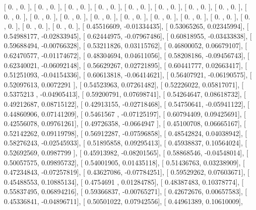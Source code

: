\documentclass{article}
\begin{document}
       [ 0.        ,  0.        ],
       [ 0.        ,  0.        ],
       [ 0.        ,  0.        ],
       [ 0.        ,  0.        ],
       [ 0.        ,  0.        ],
       [ 0.        ,  0.        ],
       [ 0.        ,  0.        ],
       [ 0.        ,  0.        ],
       [ 0.        ,  0.        ],
       [ 0.        ,  0.        ],
       [ 0.        ,  0.        ],
       [ 0.        ,  0.        ],
       [ 0.        ,  0.        ],
       [ 0.        ,  0.        ],
       [ 0.        ,  0.        ],
       [ 0.        ,  0.        ],
       [ 0.        ,  0.        ],
       [ 0.        ,  0.        ],
       [ 0.        ,  0.        ],
       [ 0.45516609, -0.01334435],
       [ 0.53065265,  0.02345994],
       [ 0.54988177, -0.02833945],
       [ 0.62444975, -0.07967486],
       [ 0.60818955, -0.03433838],
       [ 0.59688494, -0.00766328],
       [ 0.53211826,  0.03115762],
       [ 0.46800052,  0.06679107],
       [ 0.62470577, -0.01174672],
       [ 0.48304694,  0.04611056],
       [ 0.58208186, -0.09456743],
       [ 0.62340021, -0.06092148],
       [ 0.56629267,  0.02721895],
       [ 0.60441777,  0.02663417],
       [ 0.51251093, -0.04154336],
       [ 0.60613818, -0.06414621],
       [ 0.56407921, -0.06190575],
       [ 0.52097613,  0.0072291 ],
       [ 0.54523963,  0.07261482],
       [ 0.52226022,  0.05817071],
       [ 0.5375213 , -0.04905413],
       [ 0.59200791,  0.07698741],
       [ 0.54264647,  0.08618732],
       [ 0.49212687,  0.08715122],
       [ 0.42913155, -0.02718468],
       [ 0.54750641, -0.05941122],
       [ 0.44860906,  0.07141209],
       [ 0.5461567 , -0.07125197],
       [ 0.60794409,  0.09425691],
       [ 0.42556078,  0.09761261],
       [ 0.49726358, -0.0664947 ],
       [ 0.45100708,  0.06665167],
       [ 0.52142262,  0.09119798],
       [ 0.56912287, -0.07596858],
       [ 0.48542824,  0.04038942],
       [ 0.58276243, -0.02545933],
       [ 0.51895858,  0.09295413],
       [ 0.45938837,  0.10564024],
       [ 0.52692569,  0.0987799 ],
       [ 0.45913982, -0.08201565],
       [ 0.58868546, -0.04548014],
       [ 0.50057575,  0.09895732],
       [ 0.54001905,  0.01435118],
       [ 0.51436763,  0.03238909],
       [ 0.47234843, -0.07257819],
       [ 0.43627086, -0.07784251],
       [ 0.59529262,  0.07603671],
       [ 0.45488553,  0.10885134],
       [ 0.4754691 ,  0.01284785],
       [ 0.48387483,  0.10378774],
       [ 0.55837495,  0.06894216],
       [ 0.59366837, -0.00765271],
       [ 0.42672676,  0.00657583],
       [ 0.45336841, -0.04896711],
       [ 0.50501022,  0.07942556],
       [ 0.44961389,  0.10610009],
\end{document}
